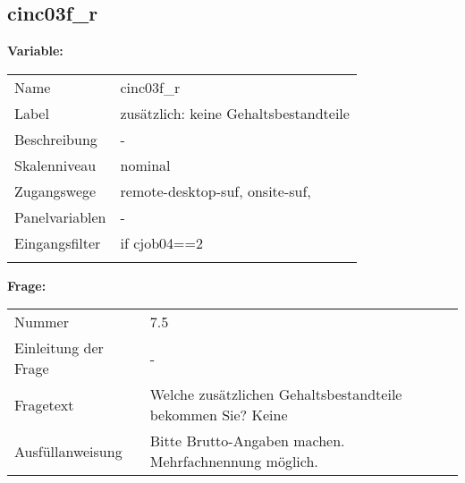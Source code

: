 	
	
	\subsection{cinc03f\_r}
	\label{subSection:cinc03f_r}

	\noindent\textbf{Variable:}\\
		\begin{tabular}{lL{11.3cm}}
			\label{tableVariable:cinc03f_r}
			Name & cinc03f\_r \\
			Label & zusätzlich: keine Gehaltsbestandteile \\
			Beschreibung & - \\
			Skalenniveau & nominal \\
			Zugangswege &
				remote-desktop-suf,
				onsite-suf,
 \\
			Panelvariablen & -
			 \\
			Eingangsfilter & if cjob04==2 \\
 \\
		\end{tabular}

		\vspace*{1 cm}
		\noindent\textbf{Frage:}\\
		\begin{tabular}{lL{11.3cm}}
			\label{tableQuestion:cinc03f_r}
			Nummer & 7.5 \\
			Einleitung der Frage & - \\
			Fragetext & Welche zusätzlichen Gehaltsbestandteile bekommen Sie?
Keine \\
			Ausfüllanweisung & 
Bitte Brutto-Angaben machen. Mehrfachnennung möglich. \\
		\end{tabular}





